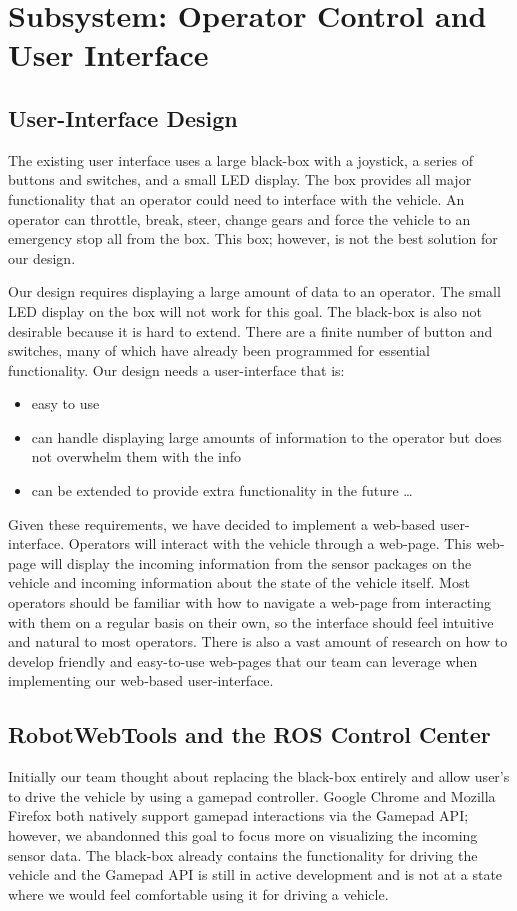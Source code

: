 \chapter{Subsystem: Operator Control and User Interface}

\section{User-Interface Design} The existing user interface uses a large black-box with a joystick, a series of buttons and switches, and a small LED display.  The box provides all major functionality that an operator could need to interface with the vehicle.  An operator can throttle, break, steer, change gears and force the vehicle to an emergency stop all from the box.  This box; however, is not the best solution for our design.

Our design requires displaying a large amount of data to an operator.  The small LED display on the box will not work for this goal.  The black-box is also not desirable because it is hard to extend.  There are a finite number of button and switches, many of which have already been programmed for essential functionality.  Our design needs a user-interface that is:
\begin{itemize}
	\item easy to use
    \item can handle displaying large amounts of information to the operator but does not overwhelm them with the info
    \item can be extended to provide extra functionality in the future \ldots
\end{itemize}
  
Given these requirements, we have decided to implement a web-based user-interface.  Operators will interact with the vehicle through a web-page.  This web-page will display the incoming information from the sensor packages on the vehicle and incoming information about the state of the vehicle itself.  Most operators should be familiar with how to navigate a web-page from interacting with them on a regular basis on their own, so the interface should feel intuitive and natural to most operators.  There is also a vast amount of research on how to develop friendly and easy-to-use web-pages that our team can leverage when implementing our web-based user-interface.

\section{RobotWebTools and the ROS Control Center}Initially our team thought about replacing the black-box entirely and allow user's to drive the vehicle by using a gamepad controller.  Google Chrome and Mozilla Firefox both natively support gamepad interactions via the Gamepad API; however, we abandonned this goal to focus more on visualizing the incoming sensor data.  The black-box already contains the functionality for driving the vehicle and the Gamepad API is still in active development and is not at a state where we would feel comfortable using it for driving a vehicle.

